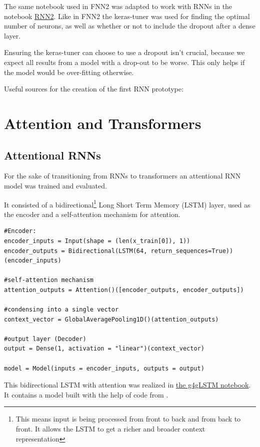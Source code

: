 \documentclass{article}
\begin{document}
The same notebook used in FNN2 was adapted to work with RNNs in the notebook 
\href{https://github.com/AntonStantan/matura/blob/main/RNN/RNN2.ipynb}{RNN2}. 
Like in FNN2 the keras-tuner was used for finding the optimal number of 
neurons, as well as whether or not to include the dropout after a dense 
layer.

Ensuring the keras-tuner can choose to use a dropout isn't crucial, because 
we expect all results from a model with a drop-out to be worse. This only 
helps if the model would be over-fitting otherwise.


Useful sources for the creation of the first RNN prototype:
\cite{bowman2015recursiveneuralnetworkslearn, tensorflow_keras_rnn,ibm_rnn}


\section{Attention and Transformers}

\subsection{Attentional RNNs}
For the sake of transitioning from RNNs to transformers an attentional RNN 
model was trained and evaluated.

It consisted of a bidirectional\footnote{This means input is being processed 
from front to back and from back to front. It allows the LSTM to get a 
richer and broader context representation} Long Short Term Memory (LSTM) 
layer, used as the encoder and a self-attention mechanism for attention. 

\begin{Verbatim}
#Encoder:
encoder_inputs = Input(shape = (len(x_train[0]), 1))
encoder_outputs = Bidirectional(LSTM(64, return_sequences=True))(encoder_inputs)

#self-attention mechanism
attention_outputs = Attention()([encoder_outputs, encoder_outputs])

#condensing into a single vector
context_vector = GlobalAveragePooling1D()(attention_outputs)

#output layer (Decoder)
output = Dense(1, activation = "linear")(context_vector)

model = Model(inputs = encoder_inputs, outputs = output)
\end{Verbatim}

This bidirectional LSTM with attention was realized in \href{https://github.com/AntonStantan/matura/blob/main/attentional-RNN/g4gLSTM.ipynb}
{the g4gLSTM notebook}. It contains a model built with the help of code from 
\cite{geeksforgeeks_attention_bilstm}. 
\end{document}
